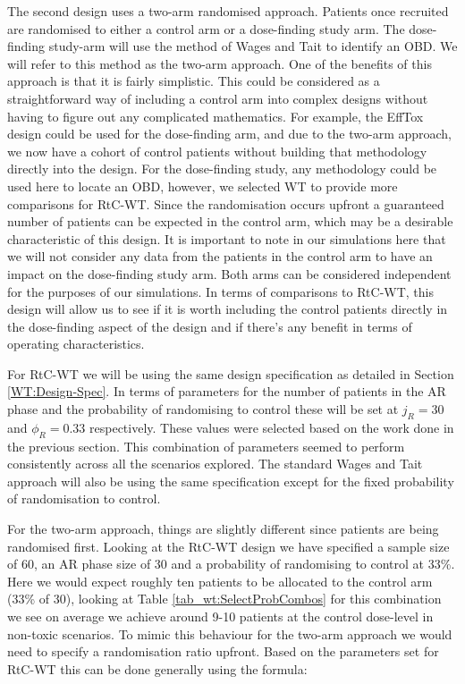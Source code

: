The second design uses a two-arm randomised approach. Patients once recruited are randomised to either a control arm or a dose-finding study arm. The dose-finding study-arm will use the method of Wages and Tait to identify an OBD. We will refer to this method as the two-arm approach. One of the benefits of this approach is that it is fairly simplistic. This could be considered as a straightforward way of including a control arm into complex designs without having to figure out any complicated mathematics. For example, the EffTox design could be used for the dose-finding arm, and due to the two-arm approach, we now have a cohort of control patients without building that methodology directly into the design. For the dose-finding study, any methodology could be used here to locate an OBD, however, we selected WT to provide more comparisons for RtC-WT. Since the randomisation occurs upfront a guaranteed number of patients can be expected in the control arm, which may be a desirable characteristic of this design. It is important to note in our simulations here that we will not consider any data from the patients in the control arm to have an impact on the dose-finding study arm. Both arms can be considered independent for the purposes of our simulations. In terms of comparisons to RtC-WT, this design will allow us to see if it is worth including the control patients directly in the dose-finding aspect of the design and if there's any benefit in terms of operating characteristics.  

For RtC-WT we will be using the same design specification as detailed in Section \ref{WT:Design-Spec}. In terms of parameters for the number of patients in the AR phase and the probability of randomising to control these will be set at $j_R = 30$ and $\phi_R = 0.33 $ respectively. These values were selected based on the work done in the previous section. This combination of parameters seemed to perform consistently across all the scenarios explored. The standard Wages and Tait approach will also be using the same specification except for the fixed probability of randomisation to control.

For the two-arm approach, things are slightly different since patients are being randomised first. Looking at the RtC-WT design we have specified a sample size of 60, an AR phase size of 30 and a probability of randomising to control at 33\%. Here we would expect roughly ten patients to be allocated to the control arm (33\% of 30), looking at Table \ref{tab_wt:SelectProbCombos} for this combination we see on average we achieve around 9-10 patients at the control dose-level in non-toxic scenarios. To mimic this behaviour for the two-arm approach we would need to specify a randomisation ratio upfront. Based on the parameters set for RtC-WT this can be done generally using the formula:

